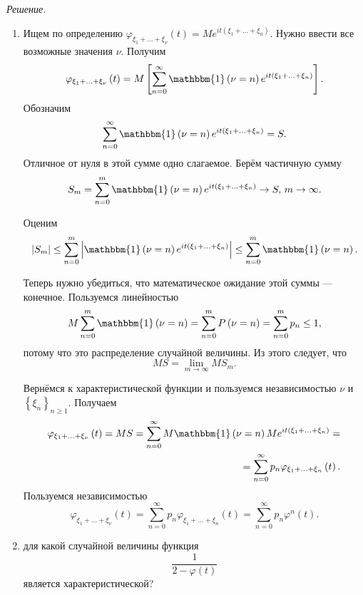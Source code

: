 \textit{Решение.}
\begin{enumerate}[label=\alph*)]
\item Ищем по определению $ \varphi_{ \xi_1 + \dotsc + \xi_{ \nu }} \left( t \right) = Me^{it \left( \xi_1 + \dotsc + \xi_n \right) }$.
Нужно ввести все возможные значения $ \nu $.
Получим
$$ \varphi_{ \xi_1 + \dotsc + \xi_{ \nu }} \left( t \right) =
M \left[ \sum \limits_{n=0}^{ \infty } \mathbbm{1} \left( \nu = n \right) e^{it \left( \xi_1 + \dotsc + \xi_n \right) } \right].$$
Обозначим
$$ \sum \limits_{n=0}^{ \infty } \mathbbm{1} \left( \nu = n \right) e^{it \left( \xi_1 + \dotsc + \xi_n \right) } = S.$$
Отличное от нуля в этой сумме одно слагаемое.
Берём частичную сумму
$$S_m =
\sum \limits_{n=0}^m \mathbbm{1} \left( \nu = n \right) e^{it \left( \xi_1 + \dotsc + \xi_n \right) } \rightarrow S, \, m \rightarrow \infty.$$

Оценим
$$ \left| S_m \right| \leq
\sum \limits_{n=0}^m \left| \mathbbm{1} \left( \nu = n \right) e^{it \left( \xi_1 + \dotsc + \xi_n \right) } \right| \leq
\sum \limits_{n=0}^m \mathbbm{1} \left( \nu = n \right).$$

Теперь нужно убедиться, что математическое ожидание этой суммы --- конечное.
Пользуемся линейностью
$$M \sum \limits_{n=0}^m \mathbbm{1} \left( \nu = n \right) =
\sum \limits_{n=0}^m P \left( \nu = n \right) =
\sum \limits_{n=0}^m p_n \leq
1,$$
потому что это распределение случайной величины.
Из этого следует, что
$$MS = \lim \limits_{m \to \infty } MS_m.$$

Вернёмся к характеристической функции и пользуемся независимостью $ \nu $ и $ \left\{ \xi_n \right\}_{n \geq 1}$.
Получаем
\begin{equation*}
\begin{split}
\varphi_{ \xi_1 + \dotsc + \xi_{ \nu }} \left( t \right) =
MS =
\sum \limits_{n=0}^{ \infty } M \mathbbm{1} \left( \nu = n \right) Me^{it \left( \xi_1 + \dotsc + \xi_n \right) } = \\
= \sum \limits_{n=0}^{ \infty } p_n \varphi_{ \xi_1 + \dotsc + \xi_n} \left( t \right).
\end{split}
\end{equation*}
Пользуемся независимостью
$$ \varphi_{ \xi_1 + \dotsc + \xi_{ \nu }} \left( t \right) =
\sum \limits_{n=0}^{ \infty } p_n \varphi_{ \xi_1 + \dotsc + \xi_n} \left( t \right) =
\sum \limits_{n=0}^{ \infty } p_n \varphi^n \left( t \right).$$
\item для какой случайной величины функция
$$ \frac{1}{2 - \varphi \left( t \right) }$$
является характеристической?
\end{enumerate}

